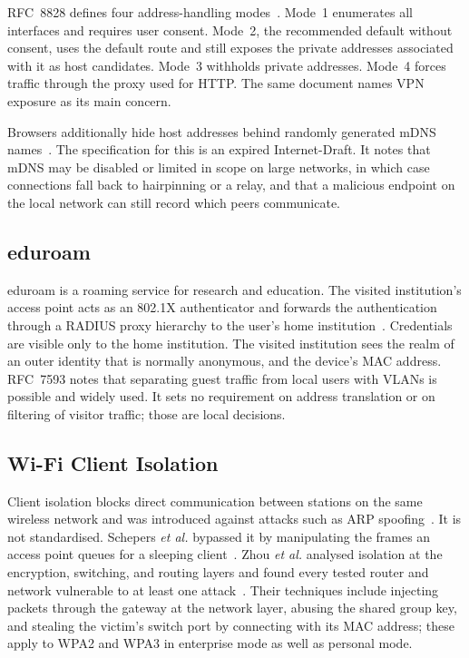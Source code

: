 \documentclass[conference]{IEEEtran}
\begin{document}
RFC~8828 defines four address-handling modes~\cite{rfc8828}. Mode~1 enumerates all interfaces and requires user consent. Mode~2, the recommended default without consent, uses the default route and still exposes the private addresses associated with it as host candidates. Mode~3 withholds private addresses. Mode~4 forces traffic through the proxy used for HTTP. The same document names VPN exposure as its main concern.

Browsers additionally hide host addresses behind randomly generated mDNS names~\cite{mdnsdraft}. The specification for this is an expired Internet-Draft. It notes that mDNS may be disabled or limited in scope on large networks, in which case connections fall back to hairpinning or a relay, and that a malicious endpoint on the local network can still record which peers communicate.

\subsection{eduroam}
eduroam is a roaming service for research and education. The visited institution's access point acts as an 802.1X authenticator and forwards the authentication through a RADIUS proxy hierarchy to the user's home institution~\cite{rfc7593}. Credentials are visible only to the home institution. The visited institution sees the realm of an outer identity that is normally anonymous, and the device's MAC address. RFC~7593 notes that separating guest traffic from local users with VLANs is possible and widely used. It sets no requirement on address translation or on filtering of visitor traffic; those are local decisions.

\subsection{Wi-Fi Client Isolation}
Client isolation blocks direct communication between stations on the same wireless network and was introduced against attacks such as ARP spoofing~\cite{mirzoev2014}. It is not standardised. Schepers \emph{et al.} bypassed it by manipulating the frames an access point queues for a sleeping client~\cite{framingframes2023,macstealer}. Zhou \emph{et al.} analysed isolation at the encryption, switching, and routing layers and found every tested router and network vulnerable to at least one attack~\cite{airsnitch2026}. Their techniques include injecting packets through the gateway at the network layer, abusing the shared group key, and stealing the victim's switch port by connecting with its MAC address; these apply to WPA2 and WPA3 in enterprise mode as well as personal mode.
\end{document}
